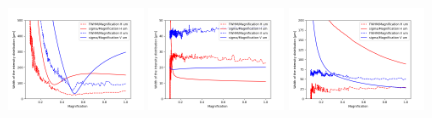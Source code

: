 \documentclass[a4paper, 11pt]{article}
\begin{document}
\begin{figure}[h]
\centering
\includegraphics[width=0.32\textwidth]{figures/scan_toroid.png}
\includegraphics[width=0.32\textwidth]{figures/scan_diaboloid.png}
\includegraphics[width=0.32\textwidth]{figures/scan_parabolic-cone.png}

\caption{\label{fig:scanToroid}
}
\end{figure}
\end{document}

